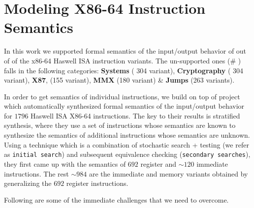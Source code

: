 
\section{Modeling X86-64 Instruction Semantics} \label{sec:modelI}

In this work we supported formal semantics of the input/output behavior of \supp{} out of \total{}  of the x86-64 Haswell ISA instruction variants.  The un-supported ones (\# \unsupp{}) falls in the following  categories: \textbf{Systems} ( 304 variant), \textbf{Cryptography} ( 304 variant), \textbf{X87}, (155 variant), \textbf{MMX} (180 variant) \& \textbf{Jumps} (263 variants). 



In order to get semantics of individual instructions, we build on top of project \Strata~\cite{Heule2016a} which automatically synthesized formal semantics  of the input/output behavior for $1796$ Haswell ISA X86-64 instructions. The key to their results is stratified synthesis, where they use a set of instructions whose semantics are known to synthesize the semantics of additional instructions whose semantics are unknown. Using a  technique which is a combination of stochastic search + testing (we refer as {\tt initial search}) and subsequent equivalence checking ({\tt secondary searches}), they 
first came up with the semantics of $692$ register and $\sim120$ immediate instructions. The rest $\sim984$ are the immediate and memory variants obtained by generalizing the $692$ register instructions.     

Following are some of the immediate challenges that we need to overcome.

